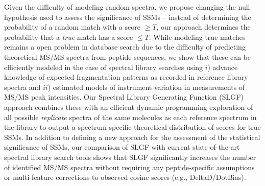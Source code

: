 \documentclass[endnotes,11pt]{article}
\begin{document}
%
%

Given the difficulty of modeling random spectra, we propose changing the null hypothesis used to assess the significance of SSMs \--- instead of determining the probability of a random match with a score $\ge T$, our approach determines the probability that a \emph{true} match has a score $\le T$. While modeling true matches remains a open problem in database search due to the difficulty of predicting theoretical MS/MS spectra from peptide sequences, we show that these can be efficiently modeled in the case of spectral library searches using $i$) advance knowledge of expected fragmentation patterns as recorded in reference library spectra and $ii$) estimated models of instrument variation in measurements of MS/MS peak intensities. Our Spectral Library Generating Function (SLGF) approach combines these with an efficient dynamic programming exploration of all possible {\em replicate} spectra of the same molecules as each reference spectrum in the library to output a spectrum-specific theoretical distribution of scores for true SSMs.
%
In addition to defining a new approach for the assessment of the statistical significance of SSMs, our comparison of SLGF with current state-of-the-art spectral library search tools shows that SLGF significantly increases the number of identified MS/MS spectra without requiring any peptide-specific assumptions or multi-feature corrections to observed cosine scores (e.g., DeltaD/DotBias).
\end{document}
